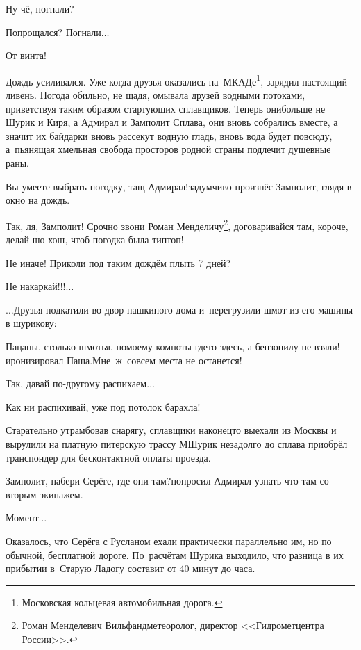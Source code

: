 \diagdash Ну чё, погнали?

\diagdash Попрощался? Погнали$\ldots$

\diagdash От винта!

\renewcommand*{\thefootnote}{\arabic{footnote}}

Дождь усиливался. Уже когда друзья оказались на~МКАДе\footnote{Московская кольцевая автомобильная дорога.}, зарядил настоящий ливень. Погода обильно, не щадя, омывала друзей водными потоками, приветствуя таким образом стартующих сплавщиков. Теперь они\mdash больше не Шурик и Киря, а Адмирал и Замполит Сплава, они вновь собрались вместе, а значит их байдарки вновь рассекут водную гладь, вновь вода будет повсюду, а~пьянящая хмельная свобода просторов родной страны подлечит душевные раны.

\diagdash Вы умеете выбрать погодку, тащ Адмирал!\mdash задумчиво произнёс Замполит, глядя в окно на дождь.

\diagdash Так, ля, Замполит! Срочно звони Роман Менделичу\footnote{Роман Менделевич Вильфанд\mdash метеоролог, директор <<Гидрометцентра России>>.}, договаривайся там, короче, делай шо хош, чтоб погодка была тип\sdash топ!

\diagdash Не иначе! Приколи под таким дождём плыть 7 дней?

\diagdash Не накаркай!!!$\ldots$

$\ldots$Друзья подкатили во двор пашкиного дома и~перегрузили шмот из его машины в шурикову:

\diagdash Пацаны, столько шмотья, по\sdash моему компоты где\sdash то здесь, а бензопилу не взяли!\mdash иронизировал Паша.\mdash Мне~ж~совсем места не останется!

\diagdash Так, давай по-другому распихаем$\ldots$

\diagdash Как ни распихивай, уже под потолок барахла!

Старательно утрамбовав снарягу, сплавщики наконец\sdash то выехали из Москвы и вырулили на платную питерскую трассу М\mdash Шурик незадолго до сплава приобрёл транспондер для бесконтактной оплаты проезда.

\diagdash Замполит, набери Серёге, где они там?\mdash попросил Адмирал узнать что там со вторым экипажем.

\diagdash Момент$\ldots$

Оказалось, что Серёга с Русланом ехали практически параллельно им, но по обычной, бесплатной дороге. По~расчётам Шурика выходило, что разница в их прибытии в~Старую Ладогу составит от 40 минут до часа.

